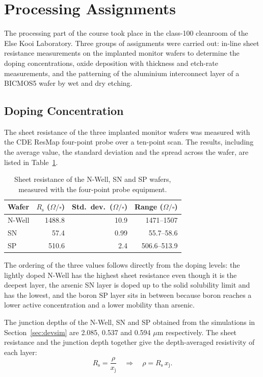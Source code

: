 \section{Processing Assignments}
\label{sec:processing}

The processing part of the course took place in the class-100 cleanroom of the Else Kooi Laboratory. Three groups of assignments were carried out: in-line sheet resistance measurements on the implanted monitor wafers to determine the doping concentrations, oxide deposition with thickness and etch-rate measurements, and the patterning of the aluminium interconnect layer of a BICMOS5 wafer by wet and dry etching.

\subsection{Doping Concentration}
The sheet resistance of the three implanted monitor wafers was measured with the CDE ResMap four-point probe over a ten-point scan. The results, including the average value, the standard deviation and the spread across the wafer, are listed in Table~\ref{tab:ch4-rsheet}.

\begin{table}[htbp]
  \centering
  \caption{Sheet resistance of the N-Well, SN and SP wafers, measured with the four-point probe equipment.}
  \label{tab:ch4-rsheet}
  \begin{tabular}{lrrr}
    \toprule
    Wafer & $R_\mathrm{s}$ ($\Omega/\square$) & Std.\ dev.\ ($\Omega/\square$) & Range ($\Omega/\square$) \\
    \midrule
    N-Well & 1488.8 & 10.9 & 1471--1507 \\
    SN     &   57.4 &  0.99 & 55.7--58.6 \\
    SP     &  510.6 &  2.4  & 506.6--513.9 \\
    \bottomrule
  \end{tabular}
\end{table}

The ordering of the three values follows directly from the doping levels: the lightly doped N-Well has the highest sheet resistance even though it is the deepest layer, the arsenic SN layer is doped up to the solid solubility limit and has the lowest, and the boron SP layer sits in between because boron reaches a lower active concentration and a lower mobility than arsenic.

The junction depths of the N-Well, SN and SP obtained from the simulations in Section~\ref{sec:devsim} are 2.085, 0.537 and 0.594 $\mu\mathrm{m}$ respectively. The sheet resistance and the junction depth together give the depth-averaged resistivity of each layer:
\begin{equation}
  R_\mathrm{s} = \frac{\rho}{x_\mathrm{j}}
  \quad\Longrightarrow\quad
  \rho = R_\mathrm{s}\,x_\mathrm{j}.
  \label{eq:rs-irvin}
\end{equation}

